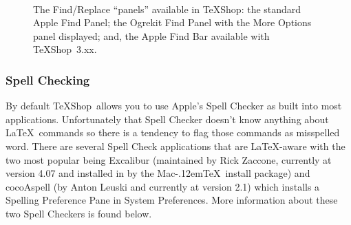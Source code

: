 \documentclass[letterpaper,11pt]{article}
\newcommand{\MacTeX}{Mac\kern-.12em\TeX}
\newcommand{\TS}{\textsf{\TeX Shop}}
\newcommand{\cmd}[1]{\textsf{#1}}
\begin{document}
\begin{figure}
\centering
{}%
\qquad%
%
\\[5pt]
\caption[Find/Replace Panels.]{The Find/Replace ``panels'' available in \TS: 
 the standard Apple Find Panel; 
 the Ogrekit Find Panel with the \cmd{More Options} panel displayed; and, 
 the Apple Find Bar available with \TS\ 3.xx.}
\label{fig:FindPanels}
\end{figure}

\subsubsection{Spell Checking}

By default \TS\ allows you to use Apple's Spell Checker as built into most applications. Unfortunately that Spell Checker doesn't know anything about \LaTeX\ commands so there is a tendency to flag those commands as misspelled word. There are several Spell Check applications that are \LaTeX-aware with the two most popular being \cmd{Excalibur} (maintained by Rick Zaccone, currently at version 4.07 and installed in  by the \MacTeX\ install package) and \cmd{cocoAspell} (by Anton Leuski and currently at version 2.1) which installs a \cmd{Spelling} Preference Pane in \cmd{System Preferences}. More information about these two Spell Checkers is found below.
\end{document}
